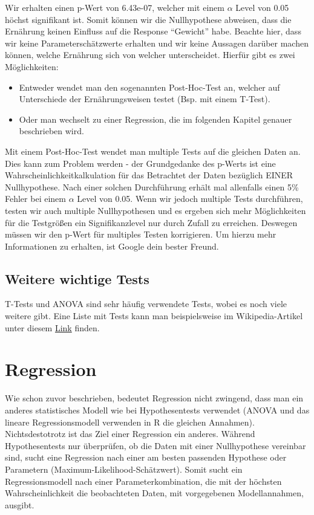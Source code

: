 \documentclass[a4paper,twoside]{tufte-book}\usepackage[]{graphicx}\usepackage[]{color}
\begin{document}
Wir erhalten einen p-Wert von 6.43e-07, welcher mit einem $\alpha$ Level von 0.05 höchst signifikant ist. Somit können wir die Nullhypothese abweisen, dass die Ernährung keinen Einfluss auf die Response "`Gewicht"' habe. Beachte hier, dass wir keine Parameterschätzwerte erhalten und wir keine Aussagen darüber machen können, welche Ernährung sich von welcher unterscheidet. Hierfür gibt es zwei Möglichkeiten:

\begin{itemize}
\item Entweder wendet man den sogenannten Post-Hoc-Test an, welcher auf Unterschiede der Ernährungsweisen testet (Bsp. mit einem T-Test).
\item Oder man wechselt zu einer Regression, die im folgenden Kapitel genauer beschrieben wird.
\end{itemize}

Mit einem Post-Hoc-Test wendet man multiple Tests auf die gleichen Daten an. Dies kann zum Problem werden - der Grundgedanke des p-Werts ist eine Wahrscheinlichkeitkalkulation für das Betrachtet der Daten bezüglich EINER Nullhypothese. Nach einer solchen Durchführung erhält mal allenfalls einen  5\% Fehler bei einem $\alpha$ Level von 0.05.  Wenn wir jedoch multiple Tests durchführen, testen wir auch multiple Nullhypothesen und es ergeben sich mehr Möglichkeiten für die Testgrößen ein Signifikanzlevel nur durch Zufall zu erreichen. Deswegen müssen wir den p-Wert für multiples Testen korrigieren. Um hierzu mehr Informationen zu erhalten, ist Google dein bester Freund. 

\subsection{Weitere wichtige Tests}

T-Tests und ANOVA sind sehr häufig verwendete Tests, wobei es noch viele weitere gibt. Eine Liste mit Tests kann man beispielsweise im Wikipedia-Artikel unter diesem \href{http://en.wikipedia.org/wiki/Category:Statistical_tests}{Link} finden.


\section{Regression}

Wie schon zuvor beschrieben, bedeutet Regression nicht zwingend, dass man ein anderes statistisches Modell wie bei Hypothesentests verwendet (ANOVA und das lineare Regressionsmodell verwenden in R die gleichen Annahmen). Nichtsdestotrotz ist das Ziel einer Regression ein anderes. Während Hypothesentests nur überprüfen, ob die Daten mit einer Nullhypothese vereinbar sind, sucht eine Regression nach einer am besten passenden Hypothese oder Parametern (Maximum-Likelihood-Schätzwert). Somit sucht ein Regressionsmodell nach einer Parameterkombination, die mit der höchsten Wahrscheinlichkeit die beobachteten Daten, mit vorgegebenen Modellannahmen, ausgibt.
\end{document}

